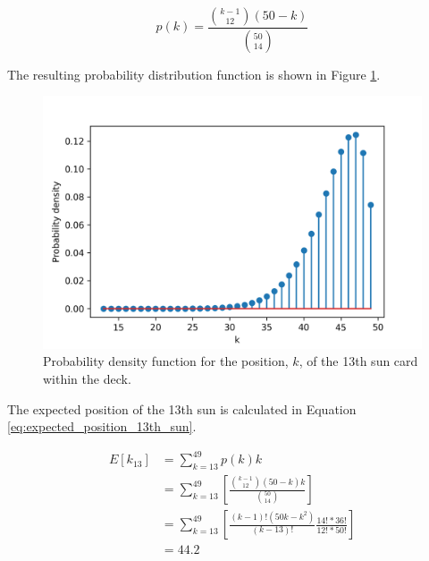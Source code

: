 \documentclass{IEEEtran}
\begin{document}
\begin{equation} \label{eq:pdf_13th_sun}
p(k) = \frac{\binom{k-1}{12} \left( 50-k \right)}{\binom{50}{14}}
\end{equation}



The resulting probability distribution function is shown in Figure \ref{fig:13th_sun_pdf}.

\begin{figure}
  \includegraphics[width=\linewidth]{pdf_13th_sun_position.png}
  \caption{Probability density function for the position, $k$, of the 13th sun card within the deck.}
  \label{fig:13th_sun_pdf}
\end{figure}

The expected position of the 13th sun is calculated in Equation \ref{eq:expected_position_13th_sun}.

\begin{equation} \label{eq:expected_position_13th_sun}
\begin{split}
E[k_{13}] & = \sum_{k=13}^{49}p(k)k \\
& = \sum_{k=13}^{49} \left[ \frac{\binom{k-1}{12} \left( 50-k \right)k}{\binom{50}{14}} \right] \\
& = \sum_{k=13}^{49} \left[ \frac{(k-1)!(50k-k^{2})} {(k-13)!} \frac{14!*36!}{12!*50!} \right] \\
& = 44.2
\end{split}
\end{equation}
\end{document}
